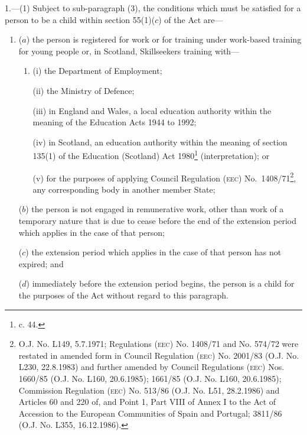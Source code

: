 \documentclass[a4paper,12pt]{article}
\begin{document}
1.—(1) Subject to sub-paragraph (3), the conditions which must be satisfied for a person to be a child within section 55(1)($c$) of the Act are—
\begin{enumerate}\item[]
($a$) the person is registered for work or for training under 
work-based training for young people or, in Scotland, Skillseekers training  %
with—
\begin{enumerate}\item[]
(i) the Department of Employment;

(ii) the Ministry of Defence;

(iii) in England and Wales, a local education authority within the meaning of the Education Acts 1944 to 1992;

(iv) in Scotland, an education authority within the meaning of section 135(1) of the Education (Scotland) Act 1980\footnote{ c. 44.} (interpretation); or

(v) for the purposes of applying Council Regulation \textsc{\lowercase{\textsc{\lowercase{(EEC)}}}}
No.\ 1408/\hspace{0pt}71\footnote{\frenchspacing O.J. No. L149, 5.7.1971; Regulations \textsc{\lowercase{(EEC)}} No. 1408/71 and No. 574/72 were restated in amended form in Council Regulation \textsc{\lowercase{(EEC)}} No. 2001/83 (O.J. No. L230, 22.8.1983) and further amended by Council Regulations \textsc{\lowercase{(EEC)}} Nos. 1660/85 (O.J. No. L160, 20.6.1985); 1661/85 (O.J. No. L160, 20.6.1985); Commission Regulation \textsc{\lowercase{(EEC)}} No. 513/86 (O.J. No. L51, 28.2.1986) and Articles 60 and 220 of, and Point 1, Part VIII of Annex I to the Act of Accession to the European Communities of Spain and Portugal; 3811/86 (O.J. No. L355, 16.12.1986).}, any corresponding body in another member State;
\end{enumerate}

($b$) the person is not engaged in remunerative work, other than work of a temporary nature that is due to cease before the end of the extension period which applies in the case of that person;

($c$) the extension period which applies in the case of that person has not expired; and

($d$) immediately before the extension period begins, the person is a child for the purposes of the Act without regard to this paragraph.
\end{enumerate}
\end{document}
